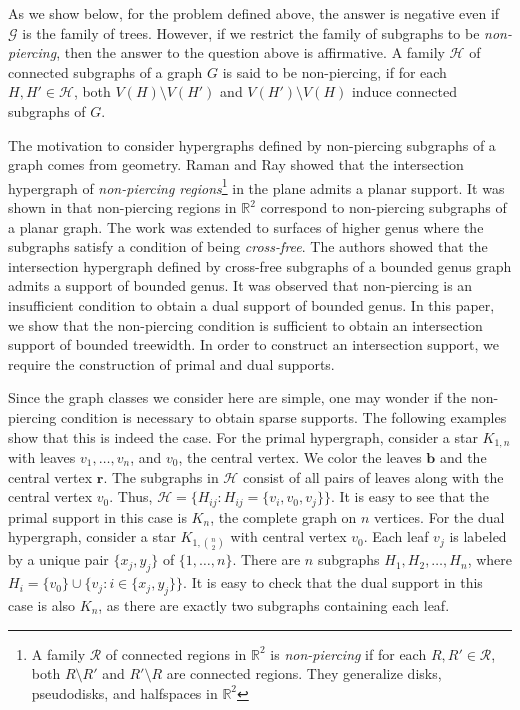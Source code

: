 \documentclass[12pt]{article}
\makeatletter
\newcommand{\GG}{\mathcal{G}}
\newcommand{\R}{\mathbf{r}}
\newcommand{\B}{\mathbf{b}}
\newcommand{\HH}{\mathcal{H}}
\newcommand{\RR}{\mathbb{R}}
\newcommand{\problemtitle}[1]{\gdef\@problemtitle{#1}}%
\newcommand{\probleminput}[1]{\gdef\@probleminput{#1}}%
\newcommand{\problemquestion}[1]{\gdef\@problemquestion{#1}}%
\theoremstyle{case}
\makeatother
\begin{document}
\begin{problem}
      \problemtitle{Intersection Support}
  \probleminput{A graph $G\in\GG$ and two collections $\mathcal{H}$ and $\mathcal{K}$ of connected subgraphs of $G$.}
  \problemquestion{Is there an intersection support $\tilde{Q}\in\GG$ on $\mathcal{H}$, 
  i.e., for each $K\in\mathcal{K}$, the set $\{H\in\mathcal{H}: V(H)\cap V(K)\neq\emptyset\}$ induces a connected subgraph of $\tilde{Q}$?}
\end{problem}

As we show below, for the problem defined above,
the answer is negative even if $\mathcal{G}$ is the family of trees.
However, if we restrict the family of subgraphs to be \emph{non-piercing},
then the answer to the question above is affirmative.
A family $\HH$ of connected subgraphs of a graph $G$ is said to be non-piercing, if for each $H,H'\in\HH$, both $V(H)\setminus V(H')$ and $V(H')\setminus V(H)$ induce connected subgraphs of $G$.

The motivation to consider hypergraphs defined by non-piercing subgraphs of a graph comes from geometry.
Raman and Ray \cite{RR18} showed that the intersection hypergraph of \emph{non-piercing regions}\footnote{A family $\mathcal{R}$ of connected regions in $\mathbb{R}^2$ is \emph{non-piercing} if for each $R,R'\in\mathcal{R}$, both $R\setminus R'$ and $R'\setminus R$ are connected regions. They generalize disks, pseudodisks, and halfspaces in $\RR^2$} in the plane admits a planar support.
It was shown in \cite{raman2025supportsgraphsboundedgenus} that non-piercing regions in $\mathbb{R}^2$ correspond to non-piercing subgraphs of a planar graph.
The work was extended to surfaces of higher genus where the subgraphs satisfy a condition of being \emph{cross-free}.
The authors showed that the intersection hypergraph defined by cross-free subgraphs of a bounded genus graph admits a support of bounded genus.
It was observed that non-piercing is an insufficient condition to obtain a dual support of bounded genus.
In this paper, we show that the non-piercing condition is sufficient to obtain an intersection support of bounded treewidth.
In order to construct an intersection support, we require the construction of
primal and dual supports.

Since the graph classes we consider here are simple, one may
wonder if the non-piercing condition is necessary
to obtain sparse supports. The following examples show that
this is indeed the case. 
For the primal hypergraph,
consider a star $K_{1,n}$
with leaves $v_1,\ldots, v_n$, and $v_0$, the central vertex.
We color the leaves $\B$ and
the central vertex $\R$. The subgraphs in $\mathcal{H}$ consist
of all pairs of leaves along with the central vertex $v_0$. Thus, $\mathcal{H}=\{H_{ij}: H_{ij}=\{v_i,v_0, v_j\}\}$. It is easy to see that the primal support in this case
is $K_n$, the complete graph on $n$ vertices. 
For the dual hypergraph, consider a star $K_{1,\binom{n}{2}}$
with central vertex $v_0$.
Each leaf $v_j$ is labeled by a unique pair $\{x_j,y_j\}$
of $\{1,\ldots, n\}$. 
There are $n$ subgraphs $H_1,H_2,\ldots,H_n$, where $H_i=\{v_0\}\cup\{v_j: i\in\{x_j,y_j\}\}$.
It is easy to check that the dual support in this case is also $K_n$,
as there are exactly two subgraphs containing each leaf.
\end{document}

